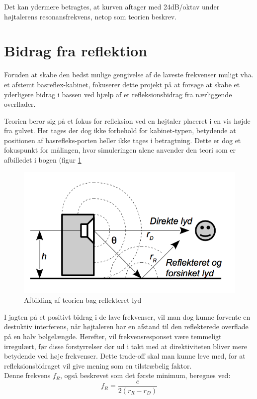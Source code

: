 Det kan ydermere betragtes, at kurven aftager med 24dB/oktav under højtalerens resonansfrekvens, netop som teorien beskrev.\cite{Elektroakustik}

\section{Bidrag fra reflektion}
\label{sec:reflection}
Foruden at skabe den bedst mulige gengivelse af de laveste frekvenser muligt vha. et afstemt basreflex-kabinet, fokuserer dette projekt på at forsøge at skabe et yderligere bidrag i bassen ved hjælp af et refleksionsbidrag fra nærliggende overflader. 

Teorien beror sig på et fokus for refleksion ved en højtaler placeret i en vis højde fra gulvet. Her tages der dog ikke forbehold for kabinet-typen, betydende at positionen af basrefleks-porten heller ikke tages i betragtning. 
Dette er dog et fokuspunkt for målingen, hvor simuleringen alene anvender den teori som er afbilledet i bogen (figur \ref{fig:reflect}
\cite{Elektroakustik}


\begin{figure}[h!]
	\centering
	\includegraphics[width=.4\textwidth]{Pics/reflect}
	\caption{Afbilding af teorien bag reflekteret lyd \cite{Elektroakustik} } 
	\label{fig:reflect}
\end{figure}

I jagten på et positivt bidrag i de lave frekvenser, vil man dog kunne forvente en destuktiv interferens, når højtaleren har en afstand til den reflekterede overflade på en halv bølgelængde. Herefter, vil frekvensresponset være temmeligt irregulært, før disse forstyrrelser dør ud i takt med at direktiviteten bliver mere betydende ved høje frekvenser. Dette trade-off skal man kunne leve med, for at refleksionsbidraget vil give mening som en tilstræbelig faktor.\\

Denne frekvens \textbf{$f_R$}, også beskrevet som det første minimum, beregnes ved:\\
\begin{equation}\label{lign:fR}
f_R=\frac{c}{2(r_R-r_D)}
\end{equation}

